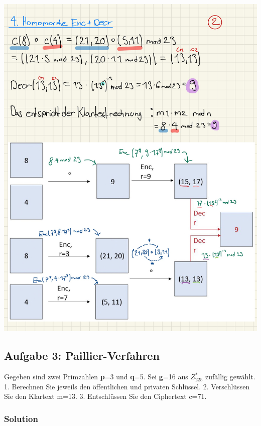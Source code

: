 \documentclass[11pt]{article}
\begin{document}
\begin{center}
	\includegraphics[scale=0.96]{img/helg2.jpg} \\
\end{center}


\newpage

    \hypertarget{aufgabe-3-paillier-verfahren}{%
\subsection{Aufgabe 3:
Paillier-Verfahren}\label{aufgabe-3-paillier-verfahren}}

Gegeben sind zwei Primzahlen \textbf{p}=3 und \textbf{q}=5. Sei
\textbf{g}=16 aus \(Z^{*}_{225}\) zufällig gewählt. 1. Berechnen Sie
jeweils den öffentlichen und privaten Schlüssel. 2. Verschlüssen Sie den
Klartext m=13. 3. Entschlüssen Sie den Ciphertext c=71.

\hypertarget{solution}{%
\subsubsection{Solution}\label{solution}}
\end{document}
